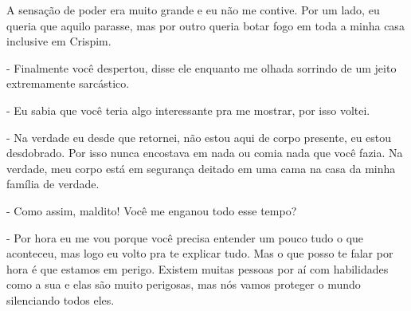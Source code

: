 A sensação de poder era muito grande e eu não me contive. Por um lado, eu queria que aquilo parasse, mas por outro queria botar fogo em toda a minha casa inclusive em Crispim.

- Finalmente você despertou, disse ele enquanto me olhada sorrindo de um jeito extremamente sarcástico.

- Eu sabia que você teria algo interessante pra me mostrar, por isso voltei.

- Na verdade eu desde que retornei, não estou aqui de corpo presente, eu estou desdobrado. Por isso nunca encostava em nada ou comia nada que você fazia. Na verdade, meu corpo está em segurança deitado em uma cama na casa da minha família de verdade.

- Como assim, maldito! Você me enganou todo esse tempo?

- Por hora eu me vou porque você precisa entender um pouco tudo o que aconteceu, mas logo eu volto pra te explicar tudo. Mas o que posso te falar por hora é que estamos em perigo. Existem muitas pessoas por aí com habilidades como a sua e elas são muito perigosas, mas nós vamos proteger o mundo silenciando todos eles.


